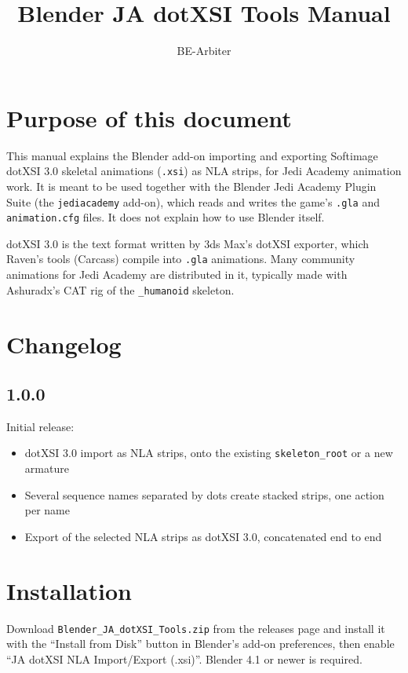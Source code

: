 \documentclass[a4paper,10pt]{article}
\title{Blender JA dotXSI Tools Manual}
\author{BE-Arbiter}
\begin{document}
 \maketitle

 \newpage

 \tableofcontents

 \newpage

 \section{Purpose of this document}

 This manual explains the Blender add-on importing and exporting Softimage dotXSI 3.0 skeletal
 animations (\texttt{.xsi}) as NLA strips, for Jedi Academy animation work. It is meant to be used
 together with the Blender Jedi Academy Plugin Suite (the \texttt{jediacademy} add-on), which reads and
 writes the game's \texttt{.gla} and \texttt{animation.cfg} files. It does not explain how to use
 Blender itself.

 dotXSI 3.0 is the text format written by 3ds Max's dotXSI exporter, which Raven's tools (Carcass)
 compile into \texttt{.gla} animations. Many community animations for Jedi Academy are distributed in
 it, typically made with Ashuradx's CAT rig of the \texttt{\_humanoid} skeleton.

 \section{Changelog}

 \subsection*{1.0.0}
 Initial release:
 \begin{itemize}
  \item dotXSI 3.0 import as NLA strips, onto the existing \texttt{skeleton\_root} or a new armature
  \item Several sequence names separated by dots create stacked strips, one action per name
  \item Export of the selected NLA strips as dotXSI 3.0, concatenated end to end
 \end{itemize}

 \section{Installation}

 Download \texttt{Blender\_JA\_dotXSI\_Tools.zip} from the releases page and install it with the
 ``Install from Disk'' button in Blender's add-on preferences, then enable
 ``JA dotXSI NLA Import/Export (.xsi)''. Blender 4.1 or newer is required.
\end{document}
